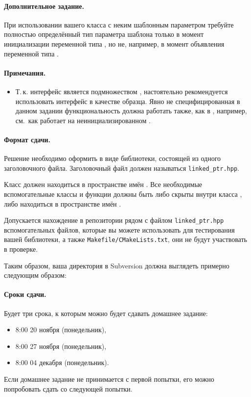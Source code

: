 \documentclass[a4paper,10pt]{article}
\begin{document}
\paragraph{Дополнительное задание.}
При использовании вашего класса с неким шаблонным параметром  требуйте полностью определённый тип параметра шаблона  только в момент инициализации переменной типа , но не, например, в момент объявления переменной типа .

\paragraph{Примечания.}
\begin{itemize}
 \item Т.\,к. интерфейс  является подмножеством , настоятельно рекомендуется использовать интерфейс  в качестве образца.
 Явно не специфицированная в данном задании функциональность должна работать также, как в , например,
 см.~как работает  на неинициализированном .
\end{itemize}

\paragraph{Формат сдачи.}
Решение необходимо оформить в виде библиотеки, состоящей из одного заголовочного файла.
Заголовочный файл должен называться {\tt linked\_ptr.hpp}.

Класс  должен находиться в пространстве имён .
Все необходимые вспомогательные классы и функции должны быть либо скрыты внутри класса , либо находиться в пространстве имён .

Допускается нахождение в репозитории рядом с файлом {\tt linked\_ptr.hpp} вспомогательных файлов, которые вы можете использовать для тестирования вашей библиотеки, а также {\tt Makefile/CMakeLists.txt}, они не будут участвовать в проверке.

Таким образом, ваша директория в Subversion должна выглядеть примерно следующим образом:

\paragraph{Сроки сдачи.}
Будет три срока, к которым можно будет сдавать домашнее задание:
\begin{itemize}
    \item 8:00 20 ноября (понедельник),
    \item 8:00 27 ноября (понедельник),
    \item 8:00 04 декабря (понедельник).
\end{itemize}
Если домашнее задание не принимается с первой попытки, его
можно попробовать сдать со следующей попытки.
\end{document}
